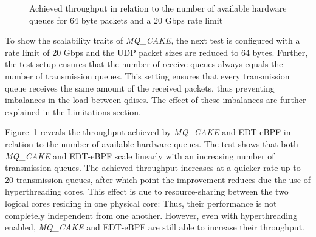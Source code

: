 \begin{figure}[h]
    \centering
    
    \caption{Achieved throughput in relation to the number of available hardware queues for 64 byte packets and a 20 Gbps rate limit}\label{fig:scaling}
\end{figure}
To show the scalability traits of \textit{MQ\_CAKE}, the next test is configured with a rate limit of 20 Gbps and the UDP packet sizes are reduced to 64 bytes.
%
Further, the test setup ensures that the number of receive queues always equals the number of transmission queues.
%
This setting ensures that every transmission queue receives the same amount of the received packets, thus preventing imbalances in the load between qdiscs.
%
The effect of these imbalances are further explained in the Limitations section.
%

Figure~\ref{fig:scaling} reveals the throughput achieved by \textit{MQ\_CAKE} and EDT-eBPF in relation to the number of available hardware queues.
%
The test shows that both \textit{MQ\_CAKE} and EDT-eBPF scale linearly with an increasing number of transmission queues.
%
The achieved throughput increases at a quicker rate up to 20 transmission queues, after which point the improvement reduces due the use of hyperthreading cores.
%
This effect is due to resource-sharing between the two logical cores residing in one physical core:
%
Thus, their performance is not completely independent from one another.
%
However, even with hyperthreading enabled, \textit{MQ\_CAKE} and EDT-eBPF are still able to increase their throughput.

